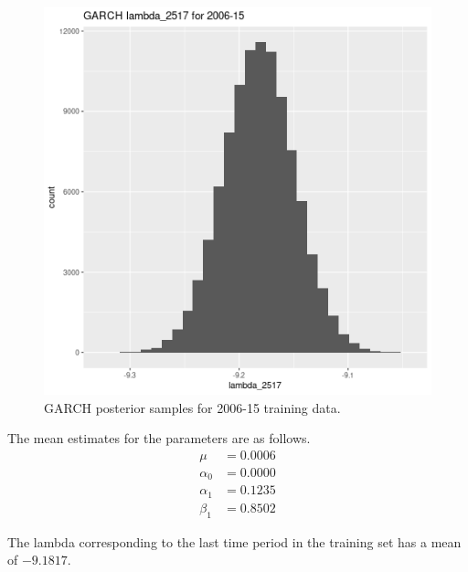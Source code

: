 \documentclass[12pt,letterpaper,reqno,fleqn]{article}
\begin{document}
\begin{figure}
\includegraphics[scale = .4]{glT0615}
\caption{GARCH posterior samples for 2006-15 training data.}
\end{figure}

The mean estimates for the parameters are as follows.
\begin{align*}
\mu &= 0.0006 \\
\alpha_0 &= 0.0000 \\
\alpha_1 &= 0.1235 \\
\beta_1 &= 0.8502
\end{align*}

The lambda corresponding to the last time period in the training set has a mean of $-9.1817$.
\end{document}
